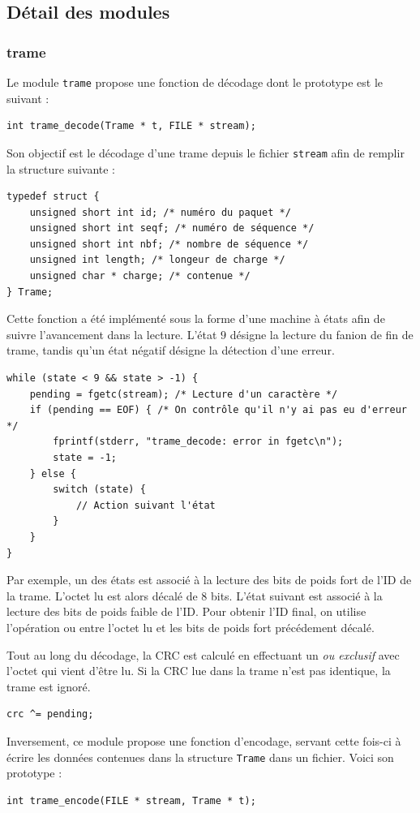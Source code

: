 \documentclass[a4paper,11pt]{article}
\begin{document}
\subsection{Détail des modules}

\subsubsection{trame}
Le module \texttt{trame} propose une fonction de décodage dont le
prototype est le suivant :
\begin{verbatim}
int trame_decode(Trame * t, FILE * stream);
\end{verbatim}
Son objectif est le décodage d'une trame depuis le fichier
\texttt{stream} afin de remplir la structure suivante :
\begin{verbatim}
typedef struct {
    unsigned short int id; /* numéro du paquet */
    unsigned short int seqf; /* numéro de séquence */
    unsigned short int nbf; /* nombre de séquence */
    unsigned int length; /* longeur de charge */
    unsigned char * charge; /* contenue */
} Trame;
\end{verbatim}
Cette fonction a été implémenté sous la forme d'une machine à états afin
de suivre l'avancement dans la lecture. L'état $9$ désigne la lecture du
fanion de fin de trame, tandis qu'un état négatif désigne la détection
d'une erreur.
\begin{verbatim}
while (state < 9 && state > -1) {
    pending = fgetc(stream); /* Lecture d'un caractère */
    if (pending == EOF) { /* On contrôle qu'il n'y ai pas eu d'erreur */
        fprintf(stderr, "trame_decode: error in fgetc\n");
        state = -1; 
    } else {
        switch (state) {
            // Action suivant l'état
        }
    }
}
\end{verbatim}
Par exemple, un des états est associé à la lecture des bits de poids fort
de l'ID de la trame. L'octet lu est alors décalé de 8 bits. L'état suivant
est associé à la lecture des bits de poids faible de l'ID. Pour obtenir
l'ID final, on utilise l'opération ou entre l'octet lu et les bits de poids
fort précédement décalé.

Tout au long du décodage, la CRC est calculé en effectuant un \textit{ou exclusif}
avec l'octet qui vient d'être lu. Si la CRC lue dans la trame n'est pas
identique, la trame est ignoré.
\begin{verbatim}
crc ^= pending;
\end{verbatim}

Inversement, ce module propose une fonction d'encodage, servant cette
fois-ci à écrire les données contenues dans la structure \texttt{Trame}
dans un fichier. Voici son prototype :
\begin{verbatim}
int trame_encode(FILE * stream, Trame * t);
\end{verbatim}
\end{document}

